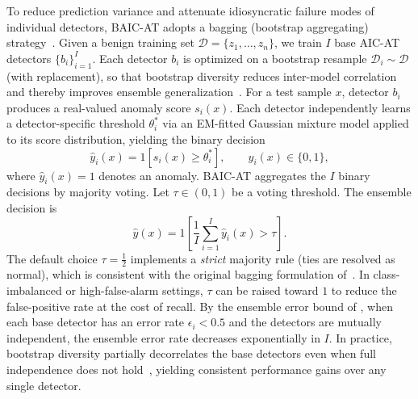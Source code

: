 \documentclass[pdflatex,sn-mathphys-num]{sn-jnl}%
\theoremstyle{thmstyleone}
\theoremstyle{thmstyletwo}%
\theoremstyle{thmstylethree}%
\begin{document}
To reduce prediction variance and attenuate idiosyncratic failure modes of individual detectors, BAIC-AT adopts a bagging (bootstrap aggregating) strategy~\cite{breiman1996bagging}. Given a benign training set $\mathcal{D} = \{z_1, \ldots, z_n\}$, we train $I$ base AIC-AT detectors $\{b_i\}_{i=1}^{I}$. Each detector $b_i$ is optimized on a bootstrap resample $\mathcal{D}_i \sim \mathcal{D}$ (with replacement), so that bootstrap diversity reduces inter-model correlation and thereby improves ensemble generalization~\cite{dietterich2000ensemble}.
For a test sample $x$, detector $b_i$ produces a real-valued anomaly score $s_i(x)$.
Each detector independently learns a detector-specific threshold $\theta_i^{*}$ via an EM-fitted Gaussian mixture model applied to its score distribution, yielding the binary decision
\begin{equation}
  \hat{y}_i(x) = \mathrm{1}\!\left[s_i(x) \geq \theta_i^{*}\right],
  \qquad \hat{y}_i(x) \in \{0, 1\},
  \label{eq:per_detector_decision}
\end{equation}
where $\hat{y}_i(x) = 1$ denotes an anomaly. BAIC-AT aggregates the $I$ binary decisions by majority voting. Let $\tau \in (0, 1)$ be a voting threshold. The ensemble decision is
 \begin{equation}
  \hat{y}(x)
  = \mathrm{1}\!\left[\frac{1}{I}\sum_{i=1}^{I}\hat{y}_i(x) > \tau\right].
  \label{eq:majority_vote}
\end{equation}
The default choice $\tau = \tfrac{1}{2}$ implements a \emph{strict} majority rule (ties are resolved as normal), which is consistent with the original bagging formulation of~\cite{breiman1996bagging}.
In class-imbalanced or high-false-alarm settings, $\tau$ can be raised toward $1$ to
reduce the false-positive rate at the cost of recall. By the ensemble error bound of \citet{hansen1990neural}, when each base detector has an error rate $\epsilon_i < 0.5$ and the detectors are mutually independent, the ensemble error rate decreases exponentially in $I$. In practice, bootstrap diversity partially decorrelates the base detectors even when full independence does not hold~\cite{dietterich2000ensemble}, yielding consistent performance gains over any single detector.
\end{document}
